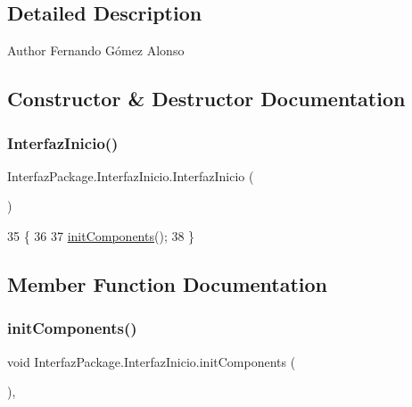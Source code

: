 \subsection{Detailed Description}
\begin{DoxyAuthor}{Author}
Fernando Gómez Alonso 
\end{DoxyAuthor}


\subsection{Constructor \& Destructor Documentation}
\mbox{\label{class_interfaz_package_1_1_interfaz_inicio_ab0f2775716e858910156769284c39718}} 
\subsubsection{\texorpdfstring{Interfaz\+Inicio()}{InterfazInicio()}}
{\footnotesize\ttfamily Interfaz\+Package.\+Interfaz\+Inicio.\+Interfaz\+Inicio (\begin{DoxyParamCaption}{ }\end{DoxyParamCaption})\hspace{0.3cm}{\ttfamily [inline]}}


\begin{DoxyCode}
35                             \{
36         
37         \mbox{\hyperlink{class_interfaz_package_1_1_interfaz_inicio_a1f93f1fda2fd3be47ef308900314f47a}{initComponents}}();
38     \}
\end{DoxyCode}


\subsection{Member Function Documentation}
\mbox{\label{class_interfaz_package_1_1_interfaz_inicio_a1f93f1fda2fd3be47ef308900314f47a}} 
\subsubsection{\texorpdfstring{init\+Components()}{initComponents()}}
{\footnotesize\ttfamily void Interfaz\+Package.\+Interfaz\+Inicio.\+init\+Components (\begin{DoxyParamCaption}{ }\end{DoxyParamCaption})\hspace{0.3cm}{\ttfamily [inline]}, {\ttfamily [private]}}

